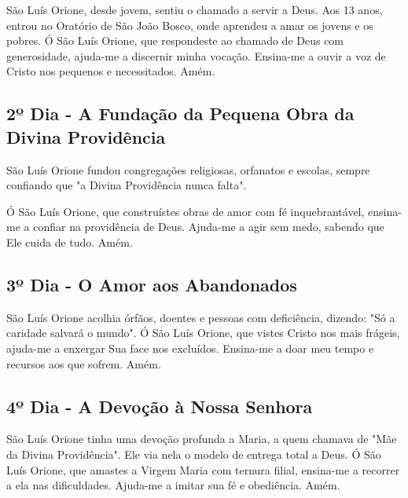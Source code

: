 \documentclass[a4paper,14pt]{extarticle} \usepackage[utf8]{inputenc}
\begin{document}
São Luís Orione, desde jovem, sentiu o chamado a servir a Deus. Aos 13 anos, entrou no Oratório de São João Bosco, onde aprendeu a amar os jovens e os pobres.
Ó São Luís Orione, que respondeste ao chamado de Deus com generosidade, ajuda-me a discernir minha vocação. Ensina-me a ouvir a voz de Cristo nos pequenos e necessitados. Amém.

\underline{}


\subsection{2º Dia - A Fundação da Pequena Obra da Divina Providência}

\underline{}

São Luís Orione fundou congregações religiosas, orfanatos e escolas, sempre confiando que "a Divina Providência nunca falta". 

Ó São Luís Orione, que construístes obras de amor com fé inquebrantável, ensina-me a confiar na providência de Deus. Ajuda-me a agir sem medo, sabendo que Ele cuida de tudo. Amém.

\underline{}


\subsection{3º Dia - O Amor aos Abandonados}

\underline{}

São Luís Orione acolhia órfãos, doentes e pessoas com deficiência, dizendo: "Só a caridade salvará o mundo".
Ó São Luís Orione, que vistes Cristo nos mais frágeis, ajuda-me a enxergar Sua face nos excluídos. Ensina-me a doar meu tempo e recursos aos que sofrem. Amém.

\underline{}


\subsection{4º Dia - A Devoção à Nossa Senhora}

\underline{}

São Luís Orione tinha uma devoção profunda a Maria, a quem chamava de "Mãe da Divina Providência". Ele via nela o modelo de entrega total a Deus.
Ó São Luís Orione, que amastes a Virgem Maria com ternura filial, ensina-me a recorrer a ela nas dificuldades. Ajuda-me a imitar sua fé e obediência. Amém.
\end{document}
